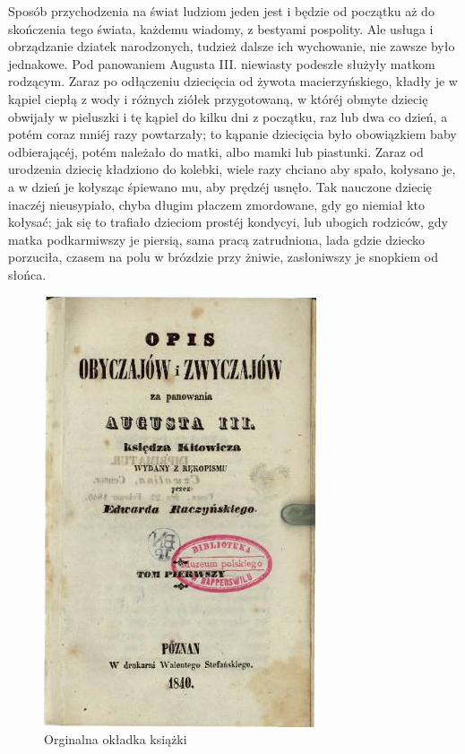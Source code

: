\documentclass{book}
\begin{document}
Sposób przychodzenia na świat ludziom jeden jest i będzie od początku aż do skończenia tego świata, każdemu wiadomy, z bestyami pospolity. Ale usługa i obrządzanie dziatek narodzonych, tudzież dalsze ich wychowanie, nie zawsze było jednakowe. Pod panowaniem Augusta III. niewiasty podeszłe służyły matkom rodzącym. Zaraz po odłączeniu dziecięcia od żywota macierzyńskiego, kładły je w kąpiel ciepłą z wody i różnych ziółek przygotowaną, w któréj obmyte dziecię obwijały w pieluszki i tę kąpiel do kilku dni z początku, raz lub dwa co dzień, a potém coraz mniéj razy powtarzały; to kąpanie dziecięcia było obowiązkiem baby odbierającéj, potém należało do matki, albo mamki lub piastunki. Zaraz od urodzenia dziecię kładziono do kolebki, wiele razy chciano aby spało, kołysano je, a w dzień je kołysząc śpiewano mu, aby prędzéj usnęło. Tak nauczone dziecię inaczéj nieusypiało, chyba długim płaczem zmordowane, gdy go niemiał kto kołysać; jak się to trafiało dzieciom prostéj kondycyi, lub ubogich rodziców, gdy matka podkarmiwszy je piersią, sama pracą zatrudniona, lada gdzie dziecko porzuciła, czasem na polu w brózdzie przy żniwie, zasłoniwszy je snopkiem od słońca.

\begin{figure}[t]
\includegraphics[scale=0.5]{okladka_304_480}
\centering
\caption{Orginalna okładka książki}
\centering
\end{figure}
\end{document}
